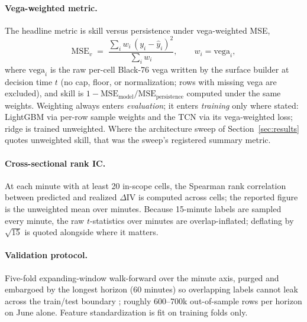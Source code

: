\documentclass[11pt]{article}
\newcommand{\dIV}{\Delta\mathrm{IV}}
\begin{document}
\paragraph{Vega-weighted metric.} The headline metric is skill versus
persistence under vega-weighted MSE,
\[
  \mathrm{MSE}_v \;=\; \frac{\sum_i w_i\,(y_i - \hat y_i)^2}{\sum_i w_i},
  \qquad w_i = \text{vega}_i,
\]
where $\text{vega}_i$ is the raw per-cell Black-76 vega written by the
surface builder at decision time $t$ (no cap, floor, or normalization; rows
with missing vega are excluded), and skill is
$1 - \mathrm{MSE}_{\text{model}} / \mathrm{MSE}_{\text{persistence}}$
computed under the same weights. Weighting always enters
\emph{evaluation}; it enters \emph{training} only where stated: LightGBM
via per-row sample weights and the TCN via its vega-weighted loss; ridge is
trained unweighted. Where the architecture sweep of
Section~\ref{sec:results} quotes unweighted skill, that was the sweep's
registered summary metric.

\paragraph{Cross-sectional rank IC.} At each minute with at least 20
in-scope cells, the Spearman rank correlation between predicted and realized
$\dIV$ is computed across cells; the reported figure is the unweighted mean
over minutes. Because 15-minute labels are sampled every minute, the raw
$t$-statistics over minutes are overlap-inflated; deflating by $\sqrt{15}$
is quoted alongside where it matters.

\paragraph{Validation protocol.} Five-fold expanding-window walk-forward
over the minute axis, purged and embargoed by the longest horizon
(60 minutes) so overlapping labels cannot leak across the train/test
boundary \cite{lopezdeprado2018}; roughly 600--700k out-of-sample rows per
horizon on June alone. Feature standardization is fit on training folds
only.
\end{document}
